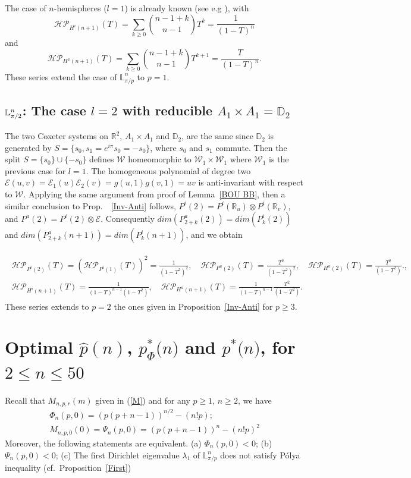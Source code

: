 \documentclass[11pt,a4paper,times]{amsart}
\theoremstyle{plain}
\theoremstyle{definition}
\numberwithin{equation}{section}
\newcommand{\pin}[1]{p^*{#1}}
\newcommand{\piphi}[1]{p^*_{\Phi}{#1}}
\newcommand{\lune}[2]{\mathbb{L}^{#1}_{#2}}
\newcommand{\luned}[2]{\raisebox{0.5pt}{${}$}\mathbb{L}^{#1}_{\pi/#2}}
\begin{document}
{The case of $n$-hemispheres ($l=1$) is already known  (see e.g \cite{bb}), with
\[ \mathcal{HP}_{H^i(n+1)}(T)=\sum_{k\geq 0}\binom{n-1+k}{n-1}T^{k} = \frac{1}{(1-T)^n}\] and
\[
 \mathcal{HP}_{H^a(n+1)}(T)=
  \sum_{k\geq 0}\binom{n-1+k}{n-1}T^{k+1}=\frac{T}{(1-T)^n}.
\]
These series extend the case of $\lune{n}{\pi/p}$ to $p=1$.

{\subsection{ $\luned{n}{2}$: The case $l=2$ with {reducible} $A_1\times A_1=\mathbb{D}_2$    
} \label{Sec 2.4}
The two Coxeter systems on $\mathbb{R}^2$, 
$A_1\times A_1$ and $\mathbb{D}_2$,  are the same  since $\mathbb{D}_2$ 
is generated by $S=\{s_0, s_1=e^{i\pi}s_0=-s_0\}$, where  $s_0$ and $s_1$ commute. Then the split $S=\{s_0\} \cup\{-s_0\}$ defines $\mathcal{W}$ homeomorphic  to $\mathcal{W}_1\times \mathcal{W}_1$ where $\mathcal{W}_1$ is the previous case for $l=1$. 
The homogeneous polynomial  of degree two $\mathcal{E}(u,v)=\mathcal{E}_1(u)\mathcal{E}_2(v)=g(u,1)g(v,1)=uv$  is anti-invariant  with respect to $\mathcal{W}$. Applying
the same argument from proof of Lemma~\ref{BOU BB}, then 
a similar conclusion to Prop.\ ~\ref{Inv-Anti} follows, 
$P^i(2)=P^i(\mathbb{R}_u)\otimes P^i(
\mathbb{R}_v)$, and $P^a(2)= P^i(2)\otimes \mathcal{E}$.
Consequently
$dim (P^a_{2+k}(2))=dim (P^i_{k}(2))$ and
$dim (P^a_{2+k}(n+1))=dim (P^i_{k}(n+1))$, and 
we obtain} 
\begin{gather*}\begin{array}{l}
\mathcal{HP}_{P^i(2)}(T)=(\mathcal{HP}_{P^i(1)}(T))^2=\frac{1}{(1-T^2)^2}, \quad 
\mathcal{HP}_{P^a(2)}(T)=
\frac{T^2}{(1-T^2)^2},\quad 
 \mathcal{HP}_{H^a(2)}(T)=\frac{T^2}{(1-T^2)}.,
 \\
\mathcal{HP}_{H^i(n+1)}(T)=\frac{1}{(1-T)^{n-1}(1-T^2)}, \quad 
\mathcal{HP}_{H^a(n+1)}(T)=\frac{1}{(1-T)^{n-1}}\frac{T^2}{(1-T^2)}.
\end{array}
\end{gather*}
These series extends to $p=2$ the ones  given in  Proposition~{\ref{Inv-Anti}}  for $p\geq 3$.


 
\section{Optimal $\hat{p}(n)$, $\piphi(n)$ and $\pin(n)$,  for $2\leq n\leq 50$\label{Sec 8}}
Recall that $M_{n,p,r}(m)$ given in (\ref{M})  and for any $p\geq 1$, $n\geq 2$, we have
  \[\begin{array}{l}
  \Phi_n(p,0)=(p(p+n-1))^{n/2}-(n!p);\\
  M_{n,p,0}(0)=\Psi_n(p,0)=(p(p+n-1))^{n}-(n!p)^2
  \end{array}\]
 Moreover, the following statements are equivalent. (a) $\Phi_n(p,0)<0$; (b) $\Psi_n(p,0)<0$; (c) The first Dirichlet eigenvalue $\lambda_1$ of $\lune{n}{\pi/p}$ does not satisfy P\'{o}lya inequality (cf.\ Proposition~\ref{First})
  
}
\end{document}
